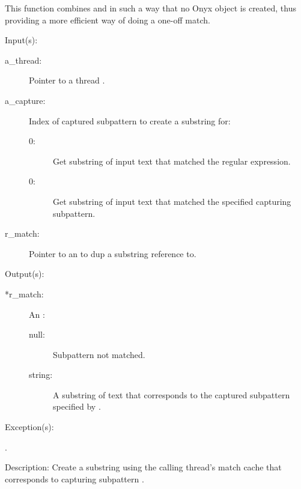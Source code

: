 \begin{capi}
\begin{capilist}
		This function combines  and
		 in such a way that no Onyx object is
		created, thus providing a more efficient way of doing a one-off
		match.
	\end{capilist}
\label{nxo_regex_submatch}
	\begin{capilist}
	\item[Input(s): ]
		\begin{description}\item[]
		\item[a\_thread: ]
			Pointer to a thread .
		\item[a\_capture: ]
			Index of captured subpattern to create a substring for:
			\begin{description}\item[]
			\item[0: ]
				Get substring of input text that matched the
				regular expression.
			\item[{\gt}0: ]
				Get substring of input text that matched the
				specified capturing subpattern.
			\end{description}
		\item[r\_match: ]
			Pointer to an  to dup a substring
			reference to.
		\end{description}
	\item[Output(s): ]
		\begin{description}\item[]
		\item[*r\_match: ]
			An :
			\begin{description}\item[]
			\item[null: ] Subpattern not matched.
			\item[string: ]
				A substring of text that corresponds to
				the captured subpattern specified by
				.
			\end{description}
		\end{description}
	\item[Exception(s): ]
		\begin{description}\item[]
		\item[.]
		\end{description}
	\item[Description: ]
		Create a substring using the calling thread's match cache that
		corresponds to capturing subpattern .
	\end{capilist}
\end{capi}

